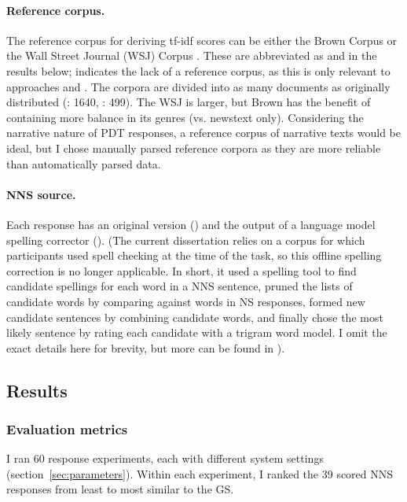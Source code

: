 \paragraph{Reference corpus.} The reference corpus for deriving tf-idf
scores can be either the Brown Corpus \citep{kucera:francis:67} or the
Wall Street Journal (WSJ) Corpus \citep{marcus-et-al:93}. These are
abbreviated as  and  in the results
below;  indicates the lack of a reference corpus, as this is
only relevant to approaches  and
. The corpora are divided into as many documents as
originally distributed (: 1640, : 499). The WSJ is
larger, but Brown has the benefit of containing more balance in its
genres (vs. newstext only). Considering the narrative nature of PDT
responses, a reference corpus of narrative texts would be ideal, but
I chose manually parsed reference corpora as they are more reliable
than automatically parsed data.

\paragraph{NNS source.} Each response has an original version
() and the output of a language model spelling corrector
(). (The current dissertation relies on a corpus for which participants used spell checking at the time of the task, so this offline spelling correction is no longer applicable. In short, it used a spelling tool to find candidate spellings for each word in a NNS sentence, pruned the lists of candidate words by comparing against words in NS responses, formed new candidate sentences by combining candidate words, and finally chose the most likely sentence by rating each candidate with a trigram word model. I omit the exact details here for brevity, but more can be found in \cite{king:dickinson:14}).

\subsection{Results}

\subsubsection{Evaluation metrics}
\label{sec:metrics}

I ran 60 response experiments, each with different system settings
(section~\ref{sec:parameters}). Within each experiment, I ranked the 39
scored NNS responses from least to most similar to the GS.

